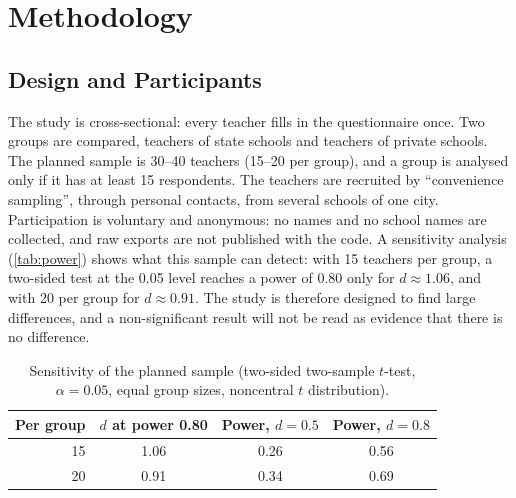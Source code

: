 \section{Methodology}\label{sec:method}

\subsection{Design and Participants}\label{sec:design}
The study is cross-sectional: every teacher fills in the questionnaire once.
Two groups are compared, teachers of state schools and teachers of private
schools. The planned sample is 30--40 teachers (15--20 per group), and a group
is analysed only if it has at least 15 respondents. The teachers are recruited
by ``convenience sampling'', through personal contacts, from several schools
of one city. Participation is voluntary and anonymous: no names and no school names are
collected, and raw exports are not published with the code.
A sensitivity analysis (\autoref{tab:power}) shows what this sample can detect: with
15 teachers per group, a two-sided test at the 0.05 level reaches a power of 0.80
only for $d \approx 1.06$, and with 20 per group for $d \approx 0.91$. The study is
therefore designed to find large differences, and a non-significant result will
not be read as evidence that there is no difference.

\begin{table}[b]
  \centering
  \caption{Sensitivity of the planned sample (two-sided two-sample $t$-test, $\alpha=0.05$,
  equal group sizes, noncentral $t$ distribution).}
  \label{tab:power}
  \footnotesize
  \begin{tabular}{@{}rccc@{}}
    \toprule
    Per group & $d$ at power 0.80 & Power, $d=0.5$ & Power, $d=0.8$ \\
    \midrule
    15 & 1.06 & 0.26 & 0.56 \\
    20 & 0.91 & 0.34 & 0.69 \\
    \bottomrule
  \end{tabular}
\end{table}

